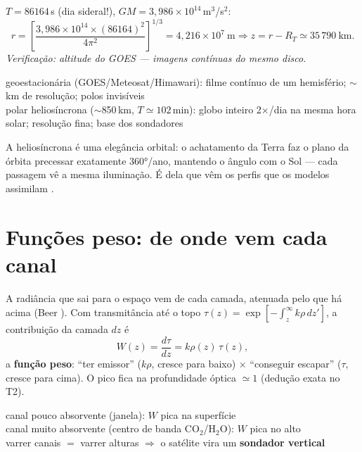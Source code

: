 \documentclass[11pt]{article}
\begin{document}
\begin{exemplo}
$T = 86164$\,s (dia sideral!), $GM = 3{,}986\times10^{14}$\,m$^3$/s$^2$:
\[ r = \left[\frac{3{,}986\times10^{14}\times(86164)^2}{4\pi^2}\right]^{1/3}
 = 4{,}216\times10^{7}\ \mathrm{m} \Rightarrow z = r - R_T \simeq
 35\,790\ \mathrm{km}. \]
\emph{Verificação: altitude do GOES — imagens contínuas do mesmo
disco.}
\end{exemplo}

\begin{noquadro}
geoestacionária (GOES/Meteosat/Himawari): filme contínuo de um
hemisfério; $\sim$km de resolução; polos invisíveis\\[2pt]
polar heliosíncrona ($\sim$850\,km, $T \simeq 102$\,min): globo inteiro
2$\times$/dia na mesma hora solar; resolução fina; base dos sondadores
\end{noquadro}

A heliosíncrona é uma elegância orbital: o achatamento da Terra faz o
plano da órbita precessar exatamente $360°$/ano, mantendo o ângulo com o
Sol — cada passagem vê a mesma iluminação. É dela que vêm os perfis que
os modelos assimilam .

\section{Funções peso: de onde vem cada canal}\label{sec:pesos}


\begin{formadif}
A radiância que sai para o espaço vem de cada camada, atenuada pelo que
há acima (Beer ). Com transmitância até o topo
$\tau(z) = \exp[-\int_z^\infty k\rho\,dz']$, a contribuição da camada
$dz$ é
\[ W(z) = \frac{d\tau}{dz} = k\rho(z)\,\tau(z), \]
a \textbf{função peso}: ``ter emissor'' ($k\rho$, cresce para baixo)
$\times$ ``conseguir escapar'' ($\tau$, cresce para cima). O pico fica
na profundidade óptica $\simeq 1$ (dedução exata no T2).
\end{formadif}

\begin{noquadro}
canal pouco absorvente (janela): $W$ pica na superfície\\
canal muito absorvente (centro de banda CO$_2$/H$_2$O): $W$ pica no
alto\\[2pt]
varrer canais $=$ varrer alturas $\Rightarrow$ o satélite vira um
\textbf{sondador vertical}
\end{noquadro}
\end{document}
